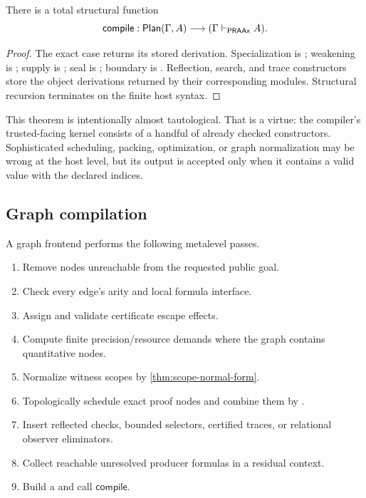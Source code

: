 \begin{theorem}
\label{thm:plan-soundness}
There is a total structural function
\[
  \mathsf{compile}:\mathsf{Plan}(\Gamma,A)
     \longrightarrow (\Gamma\mathrel{\vdash_{\mathsf{PRAAx}}} A).
\]
\end{theorem}

\begin{proof}
The exact case returns its stored derivation.  Specialization is
; weakening is ; supply is
; seal is ; boundary is .
Reflection, search, and trace constructors store the object derivations
returned by their corresponding modules.  Structural recursion terminates on
the finite host syntax.
\end{proof}

This theorem is intentionally almost tautological.  That is a virtue: the
compiler's trusted-facing kernel consists of a handful of already checked
constructors.  Sophisticated scheduling, packing, optimization, or graph
normalization may be wrong at the host level, but its output is accepted only
when it contains a valid  value with the declared indices.

\subsection{Graph compilation}

A graph frontend performs the following metalevel passes.

\begin{enumerate}[label=\textbf{C\arabic*.}]
\item Remove nodes unreachable from the requested public goal.
\item Check every edge's arity and local formula interface.
\item Assign and validate certificate escape effects.
\item Compute finite precision/resource demands where the graph contains
  quantitative nodes.
\item Normalize witness scopes by \cref{thm:scope-normal-form}.
\item Topologically schedule exact proof nodes and combine them by
  .
\item Insert reflected checks, bounded selectors, certified traces, or
  relational observer eliminators.
\item Collect reachable unresolved producer formulas in a residual context.
\item Build a  and call \(\mathsf{compile}\).
\end{enumerate}

